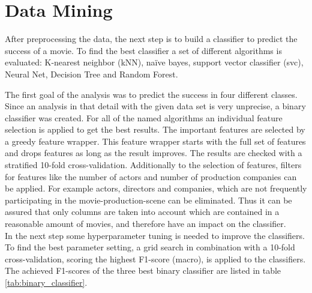 \chapter{Data Mining}
\label{cha:data_mining}


After preprocessing the data, the next step is to build a classifier to predict the success of a movie. To find the best classifier a set of different algorithms is evaluated:
K-nearest neighbor (kNN), 
na\"{i}ve bayes, 
support vector classifier (svc), 
Neural Net, 
Decision Tree and 
Random Forest.

The first goal of the analysis was to predict the success in four different classes. Since an analysis in that detail with the given data set is very unprecise, a binary classifier was created.
For all of the named algorithms an individual feature selection is applied to get the best results. The important features are selected by a greedy feature wrapper. This feature wrapper starts with the full set of features and drops features as long as the result improves. The results are checked with a stratified 10-fold cross-validation. Additionally to the selection of features, filters for features like the number of actors and number of production companies can be applied. For example actors, directors and companies, which are not frequently participating in the movie-production-scene can be eliminated. Thus it can be assured that only columns are taken into account which are contained in a reasonable amount of movies, and therefore have an impact on the classifier. \\
In the next step some hyperparameter tuning is needed to improve the classifiers. To find the best parameter setting, a grid search in combination with a 10-fold cross-validation, scoring the highest F1-score (macro), is applied to the classifiers.
The achieved F1-scores of the three best binary classifier are listed in table \ref{tab:binary_classifier}. 

